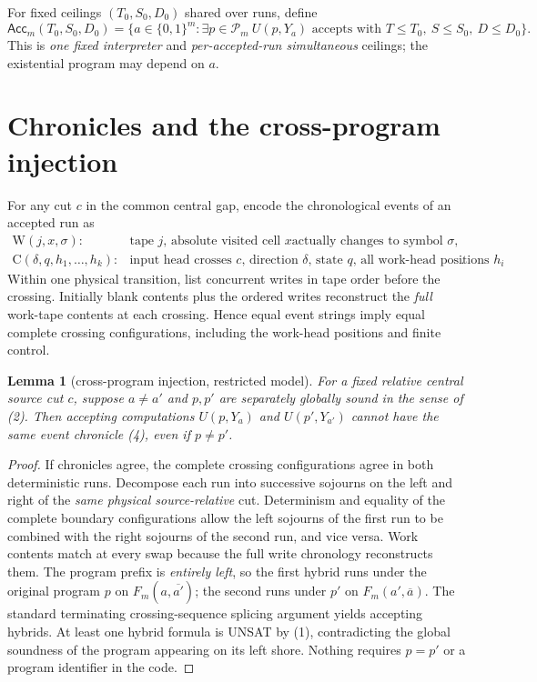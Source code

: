 \documentclass[11pt]{article}
\newtheorem{lemma}[theorem]{Lemma}
\newcommand{\Acc}{\mathsf{Acc}}
\begin{document}
For fixed ceilings $(T_0,S_0,D_0)$ shared over runs, define
\[
 \Acc_m(T_0,S_0,D_0)=
 \{a\in\{0,1\}^m:\exists p\in\mathcal P_m\
       U(p,Y_a)\text{ accepts with }T\le T_0,\
       S\le S_0,\ D\le D_0\}.
 \tag{3}
\]
This is \emph{one fixed interpreter} and \emph{per-accepted-run
simultaneous} ceilings; the existential program may depend on $a$.

\section{Chronicles and the cross-program injection}
For any cut $c$ in the common central gap, encode the chronological
events of an accepted run as
\[
 \begin{array}{ll}
  \mathrm{W}(j,x,\sigma):&\text{tape $j$, absolute visited cell $x$
                      actually changes to symbol $\sigma$},\\
  \mathrm{C}(\delta,q,h_1,\ldots,h_k):&
       \text{input head crosses $c$, direction $\delta$,
                      state $q$, all work-head positions $h_i$}.
 \end{array}
 \tag{4}
\]
Within one physical transition, list concurrent writes in tape order
before the crossing.  Initially blank contents plus the ordered writes
reconstruct the \emph{full} work-tape contents at each crossing.
Hence equal event strings imply equal complete crossing configurations,
including the work-head positions and finite control.

\begin{lemma}[cross-program injection, restricted model]
For a fixed relative central source cut $c$, suppose $a\ne a'$ and
$p,p'$ are separately globally sound in the sense of (2).
Then accepting computations $U(p,Y_a)$ and $U(p',Y_{a'})$
cannot have the same event chronicle (4), even if $p\ne p'$.
\end{lemma}
\begin{proof}
If chronicles agree, the complete crossing configurations agree in
both deterministic runs.  Decompose each run into successive sojourns
on the left and right of the \emph{same physical source-relative} cut.
Determinism and equality of the complete boundary configurations
allow the left sojourns of the first run to be combined with the right
sojourns of the second run, and vice versa.  Work contents match at
every swap because the full write chronology reconstructs them.
The program prefix is \emph{entirely left}, so the first hybrid runs
under the original program $p$ on $F_m(a,\overline {a'})$; the second
runs under $p'$ on $F_m(a',\overline a)$.  The standard terminating
crossing-sequence splicing argument yields accepting hybrids.
At least one hybrid formula is UNSAT by (1), contradicting the
global soundness of the program appearing on its left shore.
Nothing requires $p=p'$ or a program identifier in the code.
\end{proof}
\end{document}

